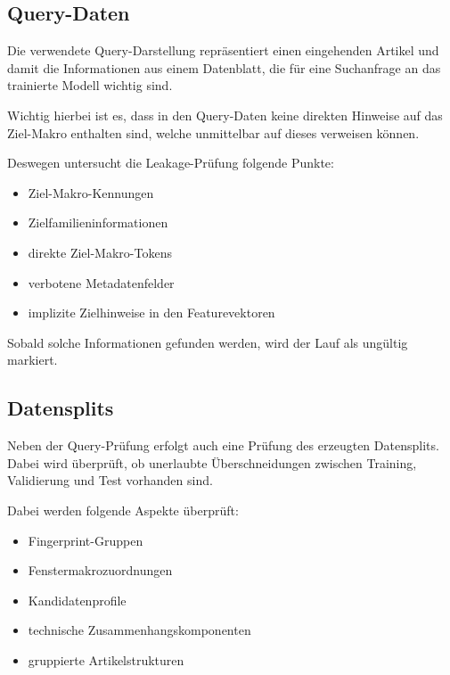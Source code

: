 \subsection{Query-Daten}

Die verwendete Query-Darstellung repräsentiert einen eingehenden Artikel \parencite{EPLANArtikelverwaltung} und damit die Informationen aus einem Datenblatt, die für eine Suchanfrage an das trainierte Modell wichtig sind.

Wichtig hierbei ist es, dass in den Query-Daten keine direkten Hinweise auf das Ziel-Makro \parencite{EPLAN-Makros} enthalten sind, welche unmittelbar auf dieses verweisen können.

Deswegen untersucht die Leakage-Prüfung folgende Punkte:

\begin{itemize} 
  \item Ziel-Makro-Kennungen \parencite{EPLAN-Makros} 
  \item Zielfamilieninformationen 
  \item direkte Ziel-Makro-Tokens \parencite{EPLAN-Makros} 
  \item verbotene Metadatenfelder 
  \item implizite Zielhinweise in den Featurevektoren 
\end{itemize}

Sobald solche Informationen gefunden werden, wird der Lauf als ungültig markiert.

\subsection{Datensplits}

Neben der Query-Prüfung erfolgt auch eine Prüfung des erzeugten Datensplits. Dabei wird überprüft, ob unerlaubte Überschneidungen zwischen Training, Validierung und Test vorhanden sind.

Dabei werden folgende Aspekte überprüft:

\begin{itemize} 
  \item Fingerprint-Gruppen 
  \item Fenstermakrozuordnungen \parencite{EPLAN-Makros} 
  \item Kandidatenprofile 
  \item technische Zusammenhangskomponenten 
  \item gruppierte Artikelstrukturen 
\end{itemize}

